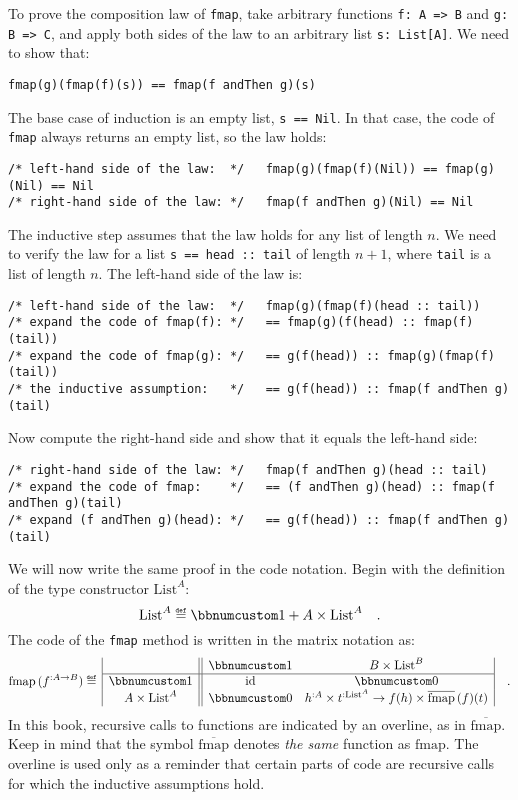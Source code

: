 To prove the composition law of \lstinline!fmap!, take arbitrary
functions \lstinline!f: A => B! and \lstinline!g: B => C!, and apply
both sides of the law to an arbitrary list \lstinline!s: List[A]!.
We need to show that:
\begin{lstlisting}
fmap(g)(fmap(f)(s)) == fmap(f andThen g)(s)
\end{lstlisting}
The base case of induction is an empty list, \lstinline!s == Nil!.
In that case, the code of \lstinline!fmap! always returns an empty
list, so the law holds:
\begin{lstlisting}
/* left-hand side of the law:  */   fmap(g)(fmap(f)(Nil)) == fmap(g)(Nil) == Nil
/* right-hand side of the law: */   fmap(f andThen g)(Nil) == Nil
\end{lstlisting}
The inductive step assumes that the law holds for any list of length
$n$. We need to verify the law for a list \lstinline!s == head :: tail!
of length $n+1$, where \lstinline!tail! is a list of length $n$.
The left-hand side of the law is:
\begin{lstlisting}
/* left-hand side of the law:  */   fmap(g)(fmap(f)(head :: tail))
/* expand the code of fmap(f): */   == fmap(g)(f(head) :: fmap(f)(tail))
/* expand the code of fmap(g): */   == g(f(head)) :: fmap(g)(fmap(f)(tail))
/* the inductive assumption:   */   == g(f(head)) :: fmap(f andThen g)(tail)
\end{lstlisting}
Now compute the right-hand side and show that it equals the left-hand
side:
\begin{lstlisting}
/* right-hand side of the law: */   fmap(f andThen g)(head :: tail)
/* expand the code of fmap:    */   == (f andThen g)(head) :: fmap(f andThen g)(tail)
/* expand (f andThen g)(head): */   == g(f(head)) :: fmap(f andThen g)(tail)
\end{lstlisting}

We will now write the same proof in the code notation. Begin with
the definition of the type constructor $\text{List}^{A}$:
\[
\text{List}^{A}\triangleq\bbnum 1+A\times\text{List}^{A}\quad.
\]
The code of the \lstinline!fmap! method is written in the matrix
notation as:
\[
\text{fmap}\,(f^{:A\rightarrow B})\triangleq\,\begin{array}{|c||cc|}
 & \bbnum 1 & B\times\text{List}^{B}\\
\hline \bbnum 1 & \text{id} & \bbnum 0\\
A\times\text{List}^{A} & \bbnum 0 & h^{:A}\times t^{:\text{List}^{A}}\rightarrow f(h)\times\overline{\text{fmap}}\,(f)(t)
\end{array}\quad.
\]
In this book, recursive calls to functions are indicated by an overline,
as in $\overline{\text{fmap}}$. Keep in mind that the symbol $\overline{\text{fmap}}$
denotes \emph{the same} function as $\text{fmap}$. The overline is
used only as a reminder that certain parts of code are recursive calls
for which the inductive assumptions hold.

